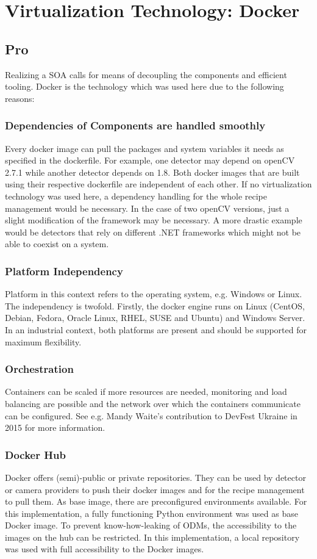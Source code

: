 \section{Virtualization Technology: Docker}
\subsection{Pro}
Realizing a SOA calls for means of decoupling the components and efficient tooling. Docker is the technology which was used here due to the following reasons:
\subsubsection{Dependencies of Components are handled smoothly} 
Every docker image can pull the packages and system variables it needs as specified in the dockerfile. For example, one detector may depend on openCV 2.7.1 while another detector depends on 1.8. Both docker images that are built using their respective dockerfile are independent of each other. If no virtualization technology was used here, a dependency handling for the whole recipe management would be necessary. In the case of two openCV versions, just a slight modification of the framework may be necessary. A more drastic example would be detectors that rely on different .NET frameworks which might not be able to coexist on a system.
\subsubsection{Platform Independency}
 Platform in this context refers to the operating system, e.g. Windows or Linux. The independency is twofold. Firstly, the docker engine runs on Linux (CentOS, Debian, Fedora, Oracle Linux, RHEL, SUSE and Ubuntu) and Windows Server. In an industrial context, both platforms are present and should be supported for maximum flexibility.
\subsubsection{Orchestration}
 Containers can be scaled if more resources are needed, monitoring and load balancing are possible and the network over which the containers communicate can be configured. See e.g. Mandy Waite's contribution to DevFest Ukraine in 2015 for more information.~\cite{Waite2015ScalableContainers}
\subsubsection{Docker Hub}
 Docker offers (semi)-public or private repositories. They can be used by detector or camera providers to push their docker images and for the recipe management to pull them. As base image, there are preconfigured environments available. For this implementation, a fully functioning Python environment was used as base Docker image. To prevent know-how-leaking of ODMs, the accessibility to the images on the hub can be restricted. In this implementation, a local repository was used with full accessibility to the Docker images.
